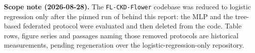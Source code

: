 \documentclass[11pt,a4paper]{article}
\begin{document}
\noindent\textbf{Scope note (2026-08-28).} The \texttt{FL-CKD-Flower} codebase was reduced to
logistic regression only after the pinned run of \RunDate{} behind this report: the MLP and the
tree-based federated protocol were evaluated and then deleted from the code. Table rows, figure
series and passages naming those removed protocols are historical measurements, pending
regeneration over the logistic-regression-only repository.

\tableofcontents
\newpage



















\printbibliography[heading=bibintoc]
\end{document}
